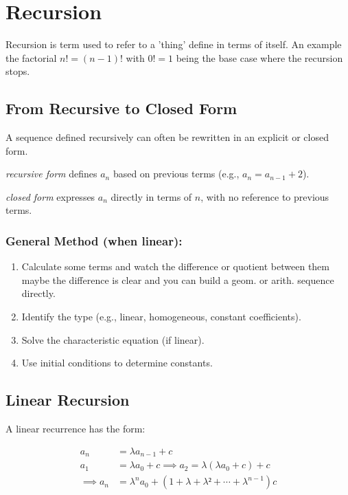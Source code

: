 \section{Recursion}

Recursion is term used to refer to a 'thing' define in terms
of itself. An example the factorial \(n! = (n - 1)!\) with \(0! = 1\) being the
base case where the recursion stops.

\subsection{From Recursive to Closed Form}

A sequence defined recursively can often be rewritten in an explicit or closed form.

\emph{recursive form} defines \( a_n \) based on previous terms (e.g., \( a_n = a_{n-1} + 2 \)).

\emph{closed form} expresses \( a_n \) directly in terms of \( n \), with no reference to previous terms.

\subsubsection*{General Method (when linear):}
\begin{enumerate}
    \item Calculate some terms and watch the difference or quotient between them
    maybe the difference is clear and you can build a geom. or arith. sequence directly.
    \item Identify the type (e.g., linear, homogeneous, constant coefficients).
    \item Solve the characteristic equation (if linear).
    \item Use initial conditions to determine constants.
\end{enumerate}

\subsection{Linear Recursion}

A linear recurrence has the form:

\begin{align*}
a_n & = \lambda a_{n -1} + c \\
a_1 & = \lambda a_0 + c \implies a_2 = \lambda (\lambda a_0 + c) + c \\
\implies a_n & = \lambda^n a_0 + (1 + \lambda + \lambda² + \cdots + \lambda^{n - 1})c
\end{align*}

